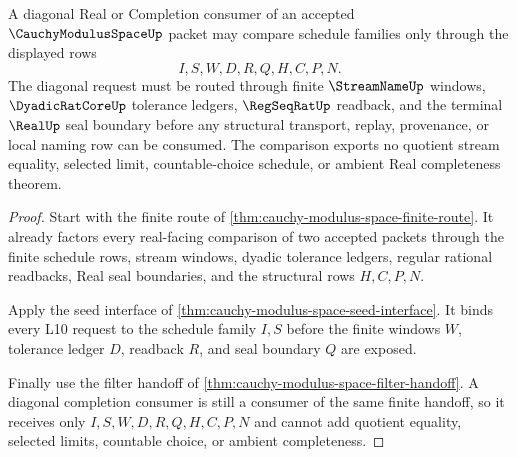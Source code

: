 \begin{theorem}
\label{thm:cauchy-modulus-space-diagonal-family-exactness}
A diagonal Real or Completion consumer of an accepted $\CauchyModulusSpaceUp$ packet may compare schedule families only through the displayed rows
$$
I,S,W,D,R,Q,H,C,P,N .
$$
The diagonal request must be routed through finite $\StreamNameUp$ windows, $\DyadicRatCoreUp$ tolerance ledgers, $\RegSeqRatUp$ readback, and the terminal $\RealUp$ seal boundary before any structural transport, replay, provenance, or local naming row can be consumed. The comparison exports no quotient stream equality, selected limit, countable-choice schedule, or ambient Real completeness theorem.
\end{theorem}
\begin{proof}
Start with the finite route of \autoref{thm:cauchy-modulus-space-finite-route}. It already factors every real-facing comparison of two accepted packets through the finite schedule rows, stream windows, dyadic tolerance ledgers, regular rational readbacks, Real seal boundaries, and the structural rows $H,C,P,N$.

Apply the seed interface of \autoref{thm:cauchy-modulus-space-seed-interface}. It binds every L10 request to the schedule family $I,S$ before the finite windows $W$, tolerance ledger $D$, readback $R$, and seal boundary $Q$ are exposed.

Finally use the filter handoff of \autoref{thm:cauchy-modulus-space-filter-handoff}. A diagonal completion consumer is still a consumer of the same finite handoff, so it receives only $I,S,W,D,R,Q,H,C,P,N$ and cannot add quotient equality, selected limits, countable choice, or ambient completeness.
\end{proof}



